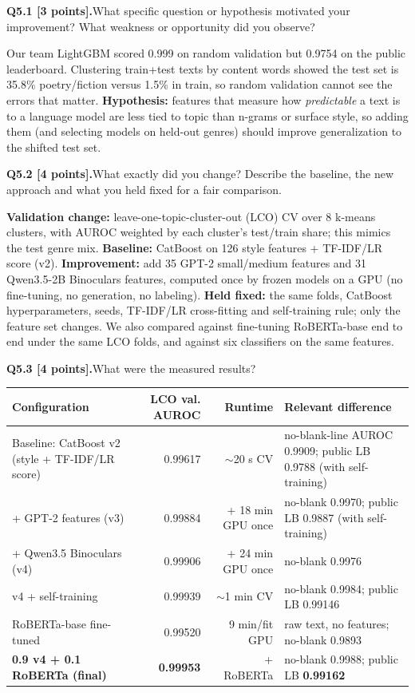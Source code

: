 \documentclass[11pt,letterpaper]{article}
\newcommand{\question}[2]{\needspace{4\baselineskip}\par\addvspace{0.45em}\noindent\textbf{#1}\quad #2\par\nobreak\vspace{0.1em}}
\begin{document}
\question{Q5.1 [3 points].}{What specific question or hypothesis motivated your improvement? What weakness or opportunity did you observe?}
Our team LightGBM scored 0.999 on random validation but 0.9754 on the public leaderboard. Clustering train+test texts by content words showed the test set is 35.8\% poetry/fiction versus 1.5\% in train, so random validation cannot see the errors that matter. \textbf{Hypothesis:} features that measure how \emph{predictable} a text is to a language model are less tied to topic than n-grams or surface style, so adding them (and selecting models on held-out genres) should improve generalization to the shifted test set.
\question{Q5.2 [4 points].}{What exactly did you change? Describe the baseline, the new approach and what you held fixed for a fair comparison.}
\textbf{Validation change:} leave-one-topic-cluster-out (LCO) CV over 8 k-means clusters, with AUROC weighted by each cluster's test/train share; this mimics the test genre mix. \textbf{Baseline:} CatBoost on 126 style features + TF-IDF/LR score (v2). \textbf{Improvement:} add 35 GPT-2 small/medium features and 31 Qwen3.5-2B Binoculars features, computed once by frozen models on a GPU (no fine-tuning, no generation, no labeling). \textbf{Held fixed:} the same folds, CatBoost hyperparameters, seeds, TF-IDF/LR cross-fitting and self-training rule; only the feature set changes. We also compared against fine-tuning RoBERTa-base end to end under the same LCO folds, and against six classifiers on the same features.
\question{Q5.3 [4 points].}{What were the measured results?}
\begin{tabularx}{\linewidth}{@{}p{1.65in}rrY@{}}\toprule Configuration & LCO val. AUROC & Runtime & Relevant difference \\ \midrule
Baseline: CatBoost v2 (style + TF-IDF/LR score) & 0.99617 & $\sim$20 s CV & no-blank-line AUROC 0.9909; public LB 0.9788 (with self-training) \\
+ GPT-2 features (v3) & 0.99884 & + 18 min GPU once & no-blank 0.9970; public LB 0.9887 (with self-training) \\
+ Qwen3.5 Binoculars (v4) & 0.99906 & + 24 min GPU once & no-blank 0.9976 \\
v4 + self-training & 0.99939 & $\sim$1 min CV & no-blank 0.9984; public LB 0.99146 \\ \midrule
RoBERTa-base fine-tuned & 0.99520 & 9 min/fit GPU & raw text, no features; no-blank 0.9893 \\
\textbf{0.9 v4 + 0.1 RoBERTa (final)} & \textbf{0.99953} & + RoBERTa & no-blank 0.9988; public LB \textbf{0.99162} \\
\bottomrule\end{tabularx}
\end{document}
